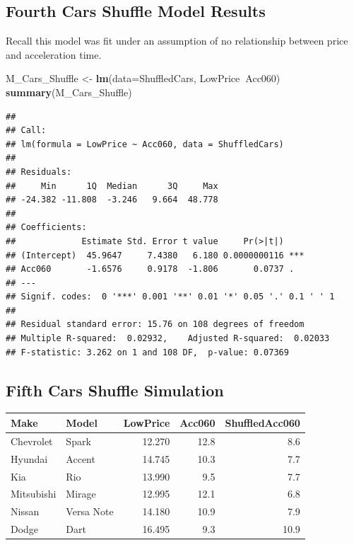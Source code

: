 \documentclass[]{book}
\newenvironment{Shaded}{\begin{snugshade}}{\end{snugshade}}
\newcommand{\KeywordTok}[1]{\textcolor[rgb]{0.13,0.29,0.53}{\textbf{#1}}}
\newcommand{\DataTypeTok}[1]{\textcolor[rgb]{0.13,0.29,0.53}{#1}}
\newcommand{\DecValTok}[1]{\textcolor[rgb]{0.00,0.00,0.81}{#1}}
\newcommand{\StringTok}[1]{\textcolor[rgb]{0.31,0.60,0.02}{#1}}
\newcommand{\OperatorTok}[1]{\textcolor[rgb]{0.81,0.36,0.00}{\textbf{#1}}}
\newcommand{\NormalTok}[1]{#1}
\begin{document}
\subsection{Fourth Cars Shuffle Model
Results}\label{fourth-cars-shuffle-model-results}

Recall this model was fit under an assumption of no relationship between
price and acceleration time.

\begin{Shaded}
\begin{Highlighting}[]
\NormalTok{M_Cars_Shuffle <-}\StringTok{ }\KeywordTok{lm}\NormalTok{(}\DataTypeTok{data=}\NormalTok{ShuffledCars, LowPrice}\OperatorTok{~}\NormalTok{Acc060)}
\KeywordTok{summary}\NormalTok{(M_Cars_Shuffle)}
\end{Highlighting}
\end{Shaded}

\begin{verbatim}
## 
## Call:
## lm(formula = LowPrice ~ Acc060, data = ShuffledCars)
## 
## Residuals:
##     Min      1Q  Median      3Q     Max 
## -24.382 -11.808  -3.246   9.664  48.778 
## 
## Coefficients:
##             Estimate Std. Error t value     Pr(>|t|)    
## (Intercept)  45.9647     7.4380   6.180 0.0000000116 ***
## Acc060       -1.6576     0.9178  -1.806       0.0737 .  
## ---
## Signif. codes:  0 '***' 0.001 '**' 0.01 '*' 0.05 '.' 0.1 ' ' 1
## 
## Residual standard error: 15.76 on 108 degrees of freedom
## Multiple R-squared:  0.02932,    Adjusted R-squared:  0.02033 
## F-statistic: 3.262 on 1 and 108 DF,  p-value: 0.07369
\end{verbatim}

\subsection{Fifth Cars Shuffle
Simulation}\label{fifth-cars-shuffle-simulation}

\begin{Shaded}
\end{Shaded}

\begin{tabular}{l|l|r|r|r}
\hline
Make & Model & LowPrice & Acc060 & ShuffledAcc060\\
\hline
Chevrolet & Spark & 12.270 & 12.8 & 8.6\\
\hline
Hyundai & Accent & 14.745 & 10.3 & 7.7\\
\hline
Kia & Rio & 13.990 & 9.5 & 7.7\\
\hline
Mitsubishi & Mirage & 12.995 & 12.1 & 6.8\\
\hline
Nissan & Versa Note & 14.180 & 10.9 & 7.9\\
\hline
Dodge & Dart & 16.495 & 9.3 & 10.9\\
\hline
\end{tabular}
\end{document}
